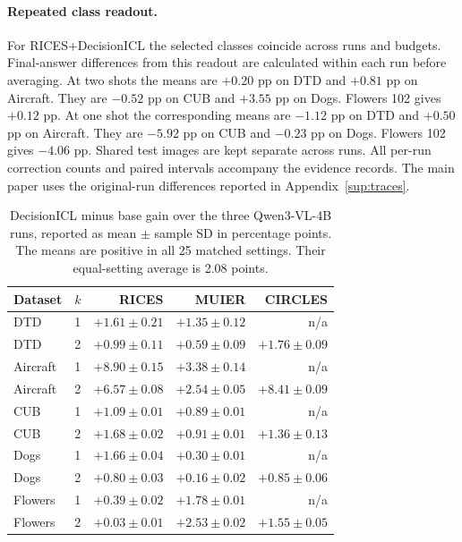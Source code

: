 \documentclass[10pt,twocolumn,letterpaper]{article}
\newcommand{\method}{DecisionICL\xspace}
\begin{document}
\paragraph{Repeated class readout.}
For RICES+DecisionICL the selected classes coincide across runs and budgets. Final-answer differences from this readout are calculated within each run before averaging. At two shots the means are $+0.20$ pp on DTD and $+0.81$ pp on Aircraft. They are $-0.52$ pp on CUB and $+3.55$ pp on Dogs. Flowers 102 gives $+0.12$ pp. At one shot the corresponding means are $-1.12$ pp on DTD and $+0.50$ pp on Aircraft. They are $-5.92$ pp on CUB and $-0.23$ pp on Dogs. Flowers 102 gives $-4.06$ pp. Shared test images are kept separate across runs. All per-run correction counts and paired intervals accompany the evidence records. The main paper uses the original-run differences reported in Appendix~\ref{sup:traces}.

\begin{table}[t]
\caption{\method minus base gain over the three Qwen3-VL-4B runs, reported as mean $\pm$ sample SD in percentage points. The means are positive in all 25 matched settings. Their equal-setting average is 2.08 points.}
\label{sup:repeat_gains}
\centering\small
\begin{tabular}{llrrr}
\toprule
Dataset & $k$ & RICES & MUIER & CIRCLES \\
\midrule
DTD & 1 & $+1.61 \pm 0.21$ & $+1.35 \pm 0.12$ & n/a \\
DTD & 2 & $+0.99 \pm 0.11$ & $+0.59 \pm 0.09$ & $+1.76 \pm 0.09$ \\
Aircraft & 1 & $+8.90 \pm 0.15$ & $+3.38 \pm 0.14$ & n/a \\
Aircraft & 2 & $+6.57 \pm 0.08$ & $+2.54 \pm 0.05$ & $+8.41 \pm 0.09$ \\
CUB & 1 & $+1.09 \pm 0.01$ & $+0.89 \pm 0.01$ & n/a \\
CUB & 2 & $+1.68 \pm 0.02$ & $+0.91 \pm 0.01$ & $+1.36 \pm 0.13$ \\
Dogs & 1 & $+1.66 \pm 0.04$ & $+0.30 \pm 0.01$ & n/a \\
Dogs & 2 & $+0.80 \pm 0.03$ & $+0.16 \pm 0.02$ & $+0.85 \pm 0.06$ \\
Flowers & 1 & $+0.39 \pm 0.02$ & $+1.78 \pm 0.01$ & n/a \\
Flowers & 2 & $+0.03 \pm 0.01$ & $+2.53 \pm 0.02$ & $+1.55 \pm 0.05$ \\
\bottomrule
\end{tabular}
\end{table}
\end{document}
